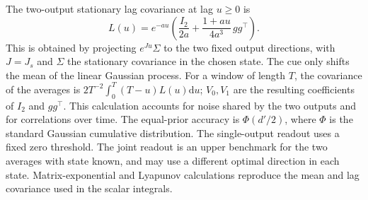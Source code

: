 \documentclass[aps,10pt,onecolumn,superscriptaddress,nofootinbib,longbibliography,
  amsmath,amssymb,floatfix]{revtex4-2}
\newcommand{\dd}{\mathrm{d}}
\begin{document}
The two-output stationary lag covariance at lag \(u\ge0\) is
\begin{equation}
  L(u)=e^{-au}\left(\frac{I_2}{2a}+
                      \frac{1+au}{4a^3}\,gg^\top\right).
\end{equation}
This is obtained by projecting \(e^{Ju}\Sigma\) to the two fixed output
directions, with \(J=J_s\) and \(\Sigma\) the stationary covariance in
the chosen state. The cue only shifts the mean of the linear Gaussian
process. For a window of length \(T\), the covariance of the averages
is \(2T^{-2}\int_0^T (T-u)L(u)\dd u\); \(V_0,V_1\) are the resulting
coefficients of \(I_2\) and \(gg^\top\).
This calculation accounts for noise shared by the two outputs and for
correlations over time. The equal-prior accuracy is \(\Phi(d'/2)\),
where \(\Phi\) is the standard Gaussian cumulative distribution.
The single-output readout uses a fixed zero threshold. The joint readout
is an upper benchmark for the two averages with state known, and may
use a different optimal direction in each state. Matrix-exponential
and Lyapunov calculations reproduce the mean and lag covariance used
in the scalar integrals.


\clearpage


\end{document}
